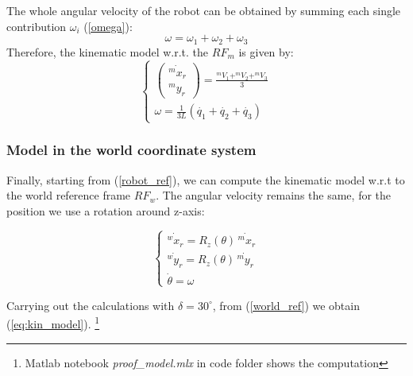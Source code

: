 The whole angular velocity of the robot can be obtained by summing each single contribution $\omega_i$ (\ref{omega}):
\begin{equation*}
    \omega = \omega_1 + \omega_2 + \omega_3 
\end{equation*}
Therefore, the kinematic model w.r.t. the $RF_{m}$ is given by:
\begin{equation}
    \left\{
        \begin{array}{ll}
            \begin{pmatrix} 
                \dot{^m x_r} \\ 
                ^m y_r  
            \end{pmatrix} 
            = \frac
                {^m V_1 + ^m V_2 + ^m V_3}
                {3}\\
            
            \omega = \frac{1}{3L}\left(\dot{q_{1}} + \dot{q_{2}} + \dot{q_{3}}\right)
        \end{array}
    \right.
    \label{robot_ref}
\end{equation}

\subsubsection{Model in the world coordinate system}
Finally, starting from (\ref{robot_ref}), we can compute the kinematic model w.r.t to the world reference frame $RF_w$. The angular velocity remains the same, for the position we use a rotation around z-axis:

\begin{equation}
	\label{world_ref}
	\left\{
		\begin{array}{ll}
			\dot{^w x_r} = R_z(\theta)\, \dot{^m x_r}\\
			\dot{^w y_r} = R_z(\theta)\, \dot{^m y_r}\\
            \dot{\theta} = \omega
		\end{array}
	\right.
\end{equation}

Carrying out the calculations with $\delta=30^{\circ}$, from (\ref{world_ref}) we obtain (\ref{eq:kin_model}). \footnote{Matlab notebook \textit{proof\_model.mlx} in code folder shows the computation}
